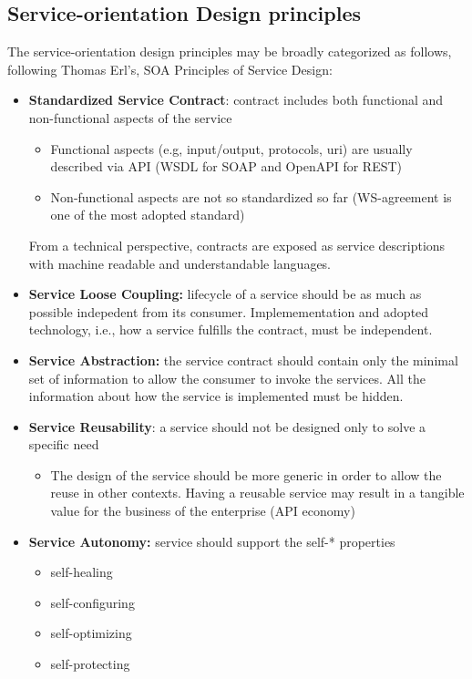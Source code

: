 \documentclass[10pt,a4paper]{article}
\begin{document}
\subsection{Service-orientation Design principles}
The service-orientation design principles may be broadly categorized as follows, following Thomas Erl's, SOA Principles of Service Design:
\begin{itemize}
	\item \textbf{Standardized Service Contract}: contract includes both functional and non-functional aspects of the service
	\begin{itemize}
		\item Functional aspects (e.g, input/output, protocols, uri) are usually described via API (WSDL for SOAP and OpenAPI for REST)
		\item Non-functional aspects are not so standardized so far (WS-agreement is one of the most adopted standard)
	\end{itemize}
	From a technical perspective, contracts are exposed as service descriptions with machine readable and understandable languages.
	\item \textbf{Service Loose Coupling:} lifecycle of a service should be as much as possible indepedent from its consumer. Implemementation and adopted technology, i.e., how a service fulfills the contract, must be independent.
	\item \textbf{Service Abstraction:} the service contract should contain only the minimal set of information to allow the consumer to invoke the services. All the information about how the service is implemented must be hidden.
	\item \textbf{Service Reusability}: a service should not be designed only to solve a specific need
	\begin{itemize}
		\item The design of the service should be more generic in order to allow the reuse in other contexts. Having a reusable service may result in a tangible value for the business of the enterprise (API economy)
	\end{itemize}
	\item \textbf{Service Autonomy:} service should support the self-* properties
	\begin{itemize}
		\item self-healing
		\item self-configuring
		\item self-optimizing
		\item self-protecting

\end{itemize}
\end{itemize}
\end{document}
